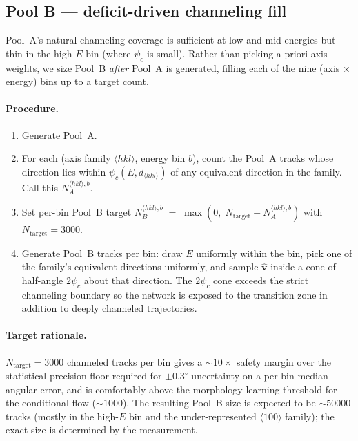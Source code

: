 \documentclass[11pt]{article}
\begin{document}
\subsection{Pool B --- deficit-driven channeling fill}

Pool~A's natural channeling coverage is sufficient at low and mid energies but
thin in the high-$E$ bin (where $\psi_c$ is small). Rather than picking a-priori
axis weights, we size Pool~B \emph{after} Pool~A is generated, filling each of
the nine (axis $\times$ energy) bins up to a target count.

\paragraph{Procedure.}
\begin{enumerate}
  \item Generate Pool~A.
  \item For each (axis family $\langle hkl\rangle$, energy bin $b$), count the
        Pool~A tracks whose direction lies within $\psi_c(E,d_{\langle hkl\rangle})$
        of any equivalent direction in the family. Call this $N_A^{\langle hkl\rangle, b}$.
  \item Set per-bin Pool~B target
        $N_B^{\langle hkl\rangle, b} \;=\; \max\!\left(0,\; N_{\text{target}}
        - N_A^{\langle hkl\rangle, b}\right)$ with
        $N_{\text{target}} = \num{3000}$.
  \item Generate Pool~B tracks per bin: draw $E$ uniformly within the bin,
        pick one of the family's equivalent directions uniformly, and sample
        $\hat{\mathbf{v}}$ inside a cone of half-angle $2\psi_c$ about that
        direction. The $2\psi_c$ cone exceeds the strict channeling boundary so
        the network is exposed to the transition zone in addition to deeply
        channeled trajectories.
\end{enumerate}

\paragraph{Target rationale.} $N_{\text{target}} = \num{3000}$ channeled tracks
per bin gives a $\sim 10\times$ safety margin over the statistical-precision
floor required for $\pm 0.3^\circ$ uncertainty on a per-bin median angular
error, and is comfortably above the morphology-learning threshold for the
conditional flow ($\sim \num{1000}$). The resulting Pool~B size is expected to
be $\sim \num{50000}$ tracks (mostly in the high-$E$ bin and the
under-represented $\langle 100\rangle$ family); the exact size is determined by
the measurement.
\end{document}
